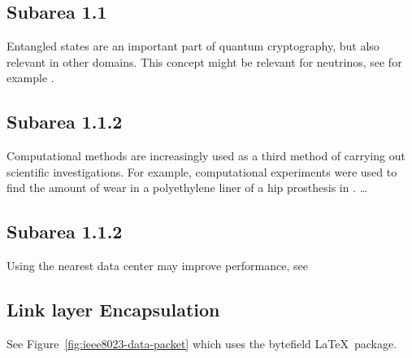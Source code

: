 \documentclass[english, bibtex]{kththesis}
\begin{document}
\subsection{Subarea 1.1}
Entangled states are an important part of quantum cryptography, but also relevant in other domains. This concept might be relevant for neutrinos, see for example \cite{kim_small-mass_2016}.

\subsection{Subarea 1.1.2}
Computational methods are increasingly used as a third method of carrying out
scientific investigations. For example, computational experiments were used to
find the amount of wear in a polyethylene liner of a hip prosthesis in \cite{maguire_jr_new_2014}.
…

\subsection{Subarea 1.1.2}
Using the nearest data center may improve performance, see \cite{bogdanov_nearest_2015}


\subsection{Link layer Encapsulation}
\label{sec:llencap}

See Figure~\ref{fig:ieee8023-data-packet} which uses the \textsf{bytefield}  \LaTeX\ package. 
\end{document}
